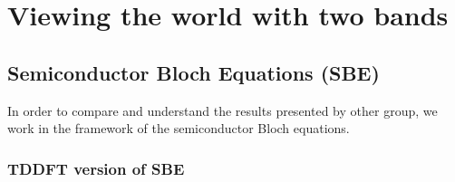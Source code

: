 \documentclass[a4paper,11pt]{report}
\begin{document}
\chapter*{Viewing the world with two bands}

\section{Semiconductor Bloch Equations (SBE)}

In order to compare and understand the results presented by other group, we work in the framework of the semiconductor Bloch equations.

\subsection{TDDFT version of SBE}
\end{document}
